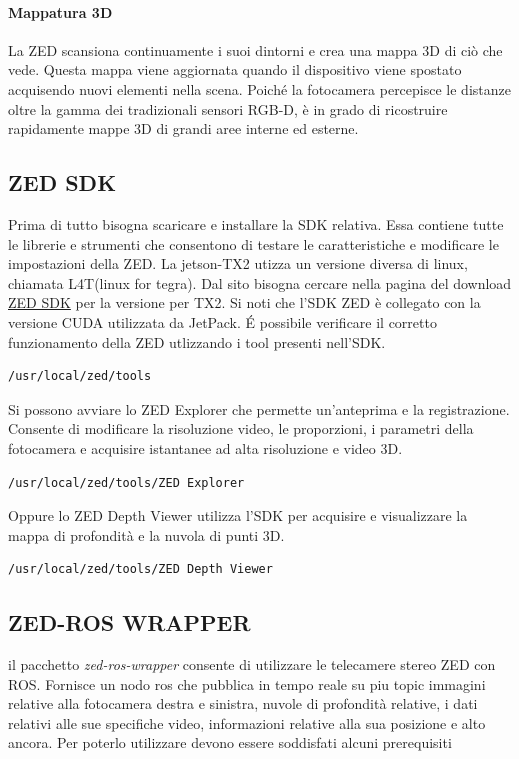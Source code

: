 \documentclass[a4paper]{article}
\begin{document}
\paragraph{Mappatura 3D}
La ZED scansiona continuamente i suoi dintorni e crea una mappa 3D di ciò che vede. Questa mappa viene aggiornata quando il dispositivo viene spostato acquisendo nuovi elementi nella scena. Poiché la fotocamera percepisce le distanze oltre la gamma dei tradizionali sensori RGB-D, è in grado di ricostruire rapidamente mappe 3D di grandi aree interne ed esterne.

\subsection{ZED SDK}
Prima di tutto bisogna scaricare e installare la SDK relativa. Essa contiene tutte le librerie e strumenti che  consentono di testare le caratteristiche e modificare le impostazioni della ZED.
La jetson-TX2 utizza un versione diversa di linux, chiamata L4T(linux for tegra). Dal sito bisogna cercare nella pagina del download 
 \href{https://www.stereolabs.com/developers/release/#sdkdownloads_anchor}{ZED SDK} per la versione per TX2. 
Si noti che l'SDK ZED è collegato con la versione CUDA utilizzata da JetPack.
\'E possibile verificare il corretto funzionamento della ZED utlizzando i tool presenti nell'SDK.
\begin{verbatim}
/usr/local/zed/tools
\end{verbatim}
Si possono avviare lo ZED Explorer che permette un'anteprima e la registrazione. Consente di modificare la risoluzione video, le proporzioni, i parametri della fotocamera e acquisire istantanee ad alta risoluzione e video 3D.
\begin{verbatim}
/usr/local/zed/tools/ZED Explorer
\end{verbatim}
Oppure lo ZED Depth Viewer utilizza l'SDK per acquisire e visualizzare la mappa di profondità e la nuvola di punti 3D.
\begin{verbatim}
/usr/local/zed/tools/ZED Depth Viewer
\end{verbatim}
\newpage
\subsection{ZED-ROS WRAPPER}

il pacchetto \textit{zed-ros-wrapper} consente di utilizzare le telecamere stereo ZED con ROS. 
Fornisce un nodo ros che pubblica in tempo reale su piu topic immagini relative alla fotocamera destra e sinistra, nuvole di profondità relative, i dati relativi alle sue specifiche video, informazioni relative alla sua posizione e alto ancora.
Per  poterlo utilizzare devono essere soddisfati alcuni prerequisiti
\end{document}
